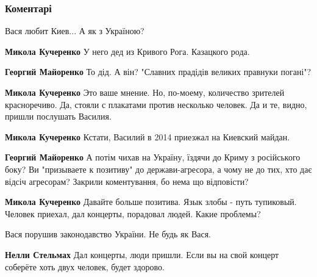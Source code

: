  
 
 
 
 
\subsubsection{Коментарі}

\begin{itemize} %
Вася любит Киев... А як з Україною?

\begin{itemize} %
\textbf{Микола Кучеренко} У него дед из Кривого Рога. Казацкого рода.

\begin{itemize} %
\textbf{Георгий Майоренко} То дід. А він? "Славних прадідів великих правнуки погані"?

\textbf{Микола Кучеренко} Это ваше мнение. Но, по-моему, количество зрителей красноречиво. Да, стояли с плакатами против несколько человек. Да и те, видно, пришли послушать Василия.

\textbf{Микола Кучеренко} Кстати, Василий в 2014 приезжал на Киевский майдан.

\textbf{Георгий Майоренко} А потім чихав на Україну, їздячи до Криму з російського боку? Ви "призываете к позитиву" до держави-агресора, а чому не до тих, хто дає відсіч агресорам? Закрили коментування, бо нема що відповісти?

\textbf{Микола Кучеренко} Давайте больше позитива. Язык злобы - путь тупиковый. Человек приехал, дал концерты, порадовал людей. Какие проблемы?
\end{itemize} %

\end{itemize} %

Вася порушив законодавство України. Не будь як Вася.

\begin{itemize} %
\textbf{Нелли Стельмах} Дал концерты, люди пришли. Если вы на свой концерт соберёте хоть двух человек, будет здорово.


\end{itemize}
\end{itemize}
